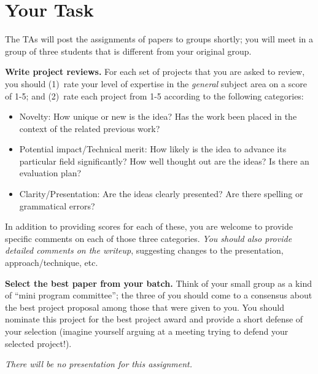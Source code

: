 \documentclass[11pt]{article}
\begin{document}
\section{Your Task}

The TAs will post the assignments of papers to groups shortly; you will
meet in a group of three students that is different from your original
group.  

{\bf Write project reviews.}
For each set of projects that you are asked to review, you
should (1)~rate your level of expertise in the {\em general} subject
area on a score of 1-5; and (2)~rate each project from 1-5 according to
the following categories:

\begin{itemize}
\itemsep=-1pt
\item Novelty: How unique or new is the idea?  Has the work been placed
  in the context of the related previous work?
\item Potential impact/Technical merit: How likely is the idea to
  advance its particular field significantly?  How well thought out are
  the ideas?  Is there an evaluation plan?
\item Clarity/Presentation: Are the ideas clearly presented?  Are there
  spelling or grammatical errors?
\end{itemize}

In addition to providing scores for each of these, you are welcome to
provide specific comments on each of those three categories.  {\em You
  should also provide detailed comments on the writeup}, suggesting
changes to the presentation, approach/technique, etc.

{\bf Select the best paper from your batch.}  
Think of your small group as a kind of ``mini program committee''; the
three of you should come to a consensus about the best project proposal
among those that were given to you.  You should nominate this project
for the best project award and provide a short defense of your selection
(imagine yourself arguing at a meeting trying to defend your selected
project!).

{\em There will be no presentation for this assignment.}
\end{document}
